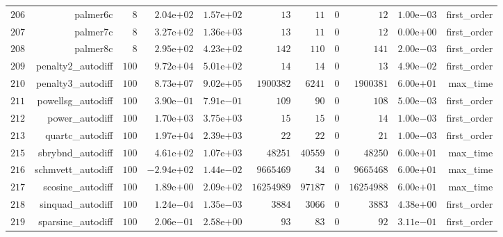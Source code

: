 \documentclass[varwidth=20cm,crop=true]{standalone}
\begin{document}
\begin{longtable}{rrrrrrrrrrr}
  \(   206\) & palmer6c & \(     8\) & \( 2.04\)e\(+02\) & \( 1.57\)e\(+02\) & \(    13\) & \(    11\) & \(     0\) & \(    12\) & \( 1.00\)e\(-03\) & first\_order \\
  \(   207\) & palmer7c & \(     8\) & \( 3.27\)e\(+02\) & \( 1.36\)e\(+03\) & \(    13\) & \(    11\) & \(     0\) & \(    12\) & \( 0.00\)e\(+00\) & first\_order \\
  \(   208\) & palmer8c & \(     8\) & \( 2.95\)e\(+02\) & \( 4.23\)e\(+02\) & \(   142\) & \(   110\) & \(     0\) & \(   141\) & \( 2.00\)e\(-03\) & first\_order \\
  \(   209\) & penalty2\_autodiff & \(   100\) & \( 9.72\)e\(+04\) & \( 5.01\)e\(+02\) & \(    14\) & \(    14\) & \(     0\) & \(    13\) & \( 4.90\)e\(-02\) & first\_order \\
  \(   210\) & penalty3\_autodiff & \(   100\) & \( 8.73\)e\(+07\) & \( 9.02\)e\(+05\) & \(1900382\) & \(  6241\) & \(     0\) & \(1900381\) & \( 6.00\)e\(+01\) & max\_time \\
  \(   211\) & powellsg\_autodiff & \(   100\) & \( 3.90\)e\(-01\) & \( 7.91\)e\(-01\) & \(   109\) & \(    90\) & \(     0\) & \(   108\) & \( 5.00\)e\(-03\) & first\_order \\
  \(   212\) & power\_autodiff & \(   100\) & \( 1.70\)e\(+03\) & \( 3.75\)e\(+03\) & \(    15\) & \(    15\) & \(     0\) & \(    14\) & \( 1.00\)e\(-03\) & first\_order \\
  \(   213\) & quartc\_autodiff & \(   100\) & \( 1.97\)e\(+04\) & \( 2.39\)e\(+03\) & \(    22\) & \(    22\) & \(     0\) & \(    21\) & \( 1.00\)e\(-03\) & first\_order \\
  \(   215\) & sbrybnd\_autodiff & \(   100\) & \( 4.61\)e\(+02\) & \( 1.07\)e\(+03\) & \( 48251\) & \( 40559\) & \(     0\) & \( 48250\) & \( 6.00\)e\(+01\) & max\_time \\
  \(   216\) & schmvett\_autodiff & \(   100\) & \(-2.94\)e\(+02\) & \( 1.44\)e\(-02\) & \(9665469\) & \(    34\) & \(     0\) & \(9665468\) & \( 6.00\)e\(+01\) & max\_time \\
  \(   217\) & scosine\_autodiff & \(   100\) & \( 1.89\)e\(+00\) & \( 2.09\)e\(+02\) & \(16254989\) & \( 97187\) & \(     0\) & \(16254988\) & \( 6.00\)e\(+01\) & max\_time \\
  \(   218\) & sinquad\_autodiff & \(   100\) & \( 1.24\)e\(-04\) & \( 1.35\)e\(-03\) & \(  3884\) & \(  3066\) & \(     0\) & \(  3883\) & \( 4.38\)e\(+00\) & first\_order \\
  \(   219\) & sparsine\_autodiff & \(   100\) & \( 2.06\)e\(-01\) & \( 2.58\)e\(+00\) & \(    93\) & \(    83\) & \(     0\) & \(    92\) & \( 3.11\)e\(-01\) & first\_order \\

\end{longtable}
\end{document}
